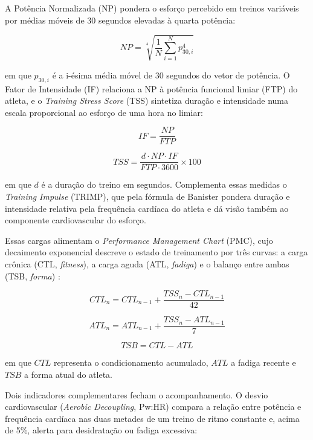 A Potência Normalizada (NP) pondera o esforço percebido em treinos variáveis
por médias móveis de 30 segundos elevadas à quarta potência:

\begin{equation}\label{eq:np}
NP = \sqrt[4]{\frac{1}{N} \sum_{i=1}^{N} p_{30,i}^4}
\end{equation}

\noindent em que $p_{30,i}$ é a i-ésima média móvel de 30 segundos do vetor de
potência. O Fator de Intensidade (IF) relaciona a NP à potência funcional
limiar (FTP) do atleta, e o \textit{Training Stress Score} (TSS) sintetiza
duração e intensidade numa escala proporcional ao esforço de uma hora no
limiar:

\begin{equation}\label{eq:if}
IF = \frac{NP}{FTP}
\end{equation}

\begin{equation}\label{eq:tss}
TSS = \frac{d \cdot NP \cdot IF}{FTP \cdot 3600} \times 100
\end{equation}

\noindent em que $d$ é a duração do treino em segundos. Complementa essas
medidas o \textit{Training Impulse} (TRIMP), que pela fórmula de Banister
pondera duração e intensidade relativa pela frequência cardíaca do atleta e
dá visão também ao componente cardiovascular do esforço.

Essas cargas alimentam o \textit{Performance Management Chart} (PMC), cujo
decaimento exponencial descreve o estado de treinamento por três curvas: a
carga crônica (CTL, \textit{fitness}), a carga aguda (ATL, \textit{fadiga}) e
o balanço entre ambas (TSB, \textit{forma}) \cite{coggan2010}:

\begin{equation}\label{eq:ctl}
CTL_{n} = CTL_{n-1} + \frac{TSS_n - CTL_{n-1}}{42}
\end{equation}

\begin{equation}\label{eq:atl}
ATL_{n} = ATL_{n-1} + \frac{TSS_n - ATL_{n-1}}{7}
\end{equation}

\begin{equation}\label{eq:tsb}
TSB = CTL - ATL
\end{equation}

\noindent em que $CTL$ representa o condicionamento acumulado, $ATL$ a fadiga
recente e $TSB$ a forma atual do atleta.

Dois indicadores complementares fecham o acompanhamento. O desvio
cardiovascular (\textit{Aerobic Decoupling}, Pw:HR) compara a relação entre
potência e frequência cardíaca nas duas metades de um treino de ritmo
constante e, acima de 5\%, alerta para desidratação ou fadiga excessiva:

